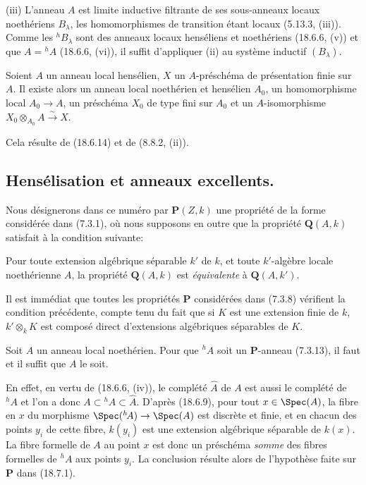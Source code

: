 (iii) L'anneau $A$ est limite inductive filtrante de ses sous-anneaux locaux noethériens $B_\lambda$, les homomorphismes de transition étant locaux (5.13.3, (iii)). Comme les ${}^h\!B_\lambda$ sont des anneaux locaux henséliens et noethériens (18.6.6, (v)) et que $A={}^h\!A$ (18.6.6, (vi)), il suffit d'appliquer (ii) au système inductif $(B_\lambda)$.

\begin{corollary}[18.6.15]
\label{IV.18.6.15}
Soient $A$ un anneau local hensélien, $X$ un $A$-préschéma de présentation finie sur $A$. Il existe alors un anneau local noethérien et hensélien $A_0$, un homomorphisme local $A_0\to A$, un préschéma $X_0$ de type fini sur $A_0$ et un $A$-isomorphisme $X_0\otimes_{A_0}A\xrightarrow{\sim}X$.
\end{corollary}

Cela résulte de (18.6.14) et de (8.8.2, (ii)).

\subsection{Hensélisation et anneaux excellents.}

\begin{env}[18.7.1]
\label{IV.18.7.1}
Nous désignerons dans ce numéro par $\mathbf P(Z,k)$ une propriété de la forme considérée dans (7.3.1), où nous supposons en outre que la propriété $\mathbf Q(A,k)$ satisfait à la condition suivante:

Pour toute extension algébrique séparable $k'$ de $k$, et toute $k'$-algèbre locale noethérienne $A$, la propriété $\mathbf Q(A,k)$ est \emph{équivalente} à $\mathbf Q(A,k')$.

Il est immédiat que toutes les propriétés $\mathbf P$ considérées dans (7.3.8) vérifient la condition précédente, compte tenu du fait que si $K$ est une extension finie de $k$, $k'\otimes_k K$ est composé direct d'extensions algébriques séparables de $K$.
\end{env}


\begin{proposition}[18.7.2]
\label{IV.18.7.2}
Soit $A$ un anneau local noethérien. Pour que ${}^h\!A$ soit un $\mathbf P$-anneau (7.3.13), il faut et il suffit que $A$ le soit.
\end{proposition}

En effet, en vertu de (18.6.6, (iv)), le complété $\widehat A$ de $A$ est aussi le complété de ${}^h\!A$ et l'on a donc $A\subset{}^h\!A\subset\widehat A$. D'après (18.6.9), pour tout $x\in\Spec(A)$, la fibre en $x$ du morphisme $\Spec({}^h\!A)\to\Spec(A)$ est discrète et finie, et en chacun des points $y_i$ de cette fibre, $k(y_i)$ est une extension algébrique séparable de $k(x)$. La fibre formelle de $A$ au point $x$ est donc un préschéma \emph{somme} des fibres formelles de ${}^h\!A$ aux points $y_i$. La conclusion résulte alors de l'hypothèse faite sur $\mathbf P$ dans (18.7.1).

